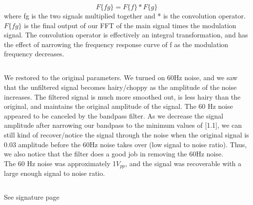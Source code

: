 \documentclass{article}
\begin{document}
\begin{itemize}
        \begin{equation}
            F\{fg\} = F\{f\}*F\{g\}
        \end{equation}
        where fg is the two signals multiplied together and * is the convolution operator. $F\{fg\}$ is the final output of our FFT of the main signal times the modulation signal. The convolution operator is effectively an integral transformation, and has the effect of narrowing the frequency response curve of f as the modulation frequency decreases.
    \end{itemize}

\subsection{}
    We restored to the original parameters. We turned on 60Hz noise, and we saw that the unfiltered signal becomes hairy/choppy as the amplitude of the noise increases. The filtered signal is much more smoothed out, is less hairy than the original, and maintains the original amplitude of the signal. The 60 Hz noise appeared to be canceled by the bandpass filter. As we decrease the signal amplitude after narrowing our bandpass to the minimum values of [1.1], we can still kind of recover/notice the signal through the noise when the original signal is 0.03 amplitude before the 60Hz noise takes over (low signal to noise ratio). Thus, we also notice that the filter does a good job in removing the 60Hz noise.\\\indent The 60 Hz noise was approximately 1$V_{pp}$, and the signal was recoverable with a large enough signal to noise ratio.  
    
    
\subsection{}
    See signature page
    
\end{document}
